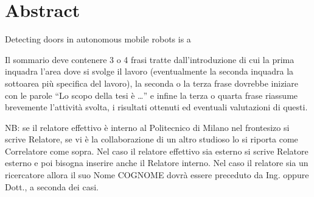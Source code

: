 \newpage
\chapter{Abstract}

Detecting doors in autonomous mobile robots is a

Il sommario deve contenere 3 o 4 frasi tratte dall'introduzione di cui la prima inquadra l'area dove si svolge il lavoro (eventualmente la seconda inquadra la sottoarea pi\`u specifica del lavoro), la seconda o la terza frase dovrebbe iniziare con le parole ``Lo scopo della tesi \`e \dots'' e infine la terza o quarta frase riassume brevemente l'attivit\`a svolta, i risultati ottenuti ed eventuali valutazioni di questi.

\vspace{0.5cm}
\noindent NB: se il relatore effettivo \`e interno al Politecnico di Milano nel frontesizo si scrive Relatore, se vi \`e la collaborazione di un altro studioso lo si riporta come Correlatore come sopra. Nel caso il relatore effettivo sia esterno si scrive Relatore esterno e poi bisogna inserire anche il Relatore interno. Nel caso il relatore sia un ricercatore allora il suo Nome COGNOME dovr\`a essere preceduto da Ing. oppure Dott., a seconda dei casi.
